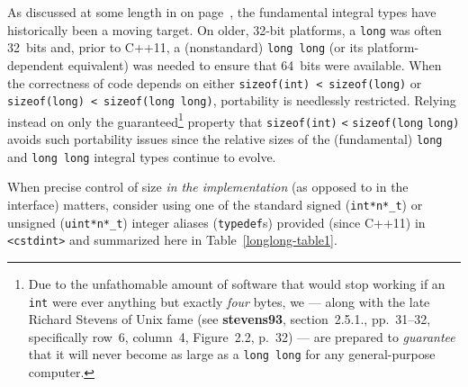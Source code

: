 As discussed at some length in {\it{}} on page~\pageref{longlong-appendix}, the
fundamental integral types have historically been a moving target. On
older, 32-bit platforms, a \texttt{long} was often 32~bits and, prior to
C++11, a (nonstandard) \texttt{long}~\texttt{long} (or its
platform-dependent equivalent) was needed to ensure that 64~bits were
available. When the correctness of code depends on either
\texttt{sizeof(int)}~\texttt{<}~\texttt{sizeof(long)} or
\texttt{sizeof(long)}~\texttt{<}~\texttt{sizeof(long}~\texttt{long)},
portability is needlessly restricted. Relying instead on only the
guaranteed{\cprotect\footnote{Due to the unfathomable amount of software
that would stop working if an \texttt{int} were ever anything but
exactly \emph{four} bytes, we --- along with the late Richard Stevens
  of Unix fame (see \textbf{{stevens93}}, section~2.5.1., pp.~31--32, specifically row~6, column~4, Figure~2.2, p.~32) --- are prepared
  to \emph{guarantee} that it will never become as large as a
  \texttt{long}~\texttt{long} for any general-purpose computer.}}
property that
\texttt{sizeof(int)} \texttt{<} \texttt{sizeof(long} \texttt{long)}
avoids such portability issues since the relative sizes of the
(fundamental) \texttt{long} and \texttt{long}~\texttt{long} integral
types continue to evolve.

When precise control of size \emph{in the implementation} (as opposed to
in the interface) matters, consider using one of the standard signed
(\texttt{int*n*\_t}) or unsigned (\texttt{uint*n*\_t}) integer aliases
(\texttt{typedef}s) provided (since C++11) in \texttt{<cstdint>} and
summarized here in Table~\ref{longlong-table1}.\newpage

